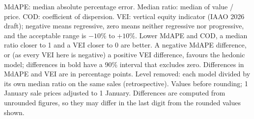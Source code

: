 \begin{table}[htbp]
\begin{tabular}{@{}lrlrrrrccc@{}}
\bottomrule
\end{tabular}
\par\smallskip\footnotesize\raggedright MdAPE: median absolute percentage error. Median ratio: median of value / price.
COD: coefficient of dispersion. VEI: vertical equity indicator (IAAO 2026 draft); negative means regressive,
zero means neither regressive nor progressive, and the acceptable range is $-10\%$ to $+10\%$. Lower MdAPE and COD, a
median ratio closer to 1 and a VEI closer to 0 are better. A negative MdAPE difference, or (as every VEI here is
negative) a positive VEI difference, favours the hedonic model; differences in bold have a 90\% interval that excludes
zero. Differences in MdAPE and VEI are in percentage points. Level removed: each model divided by its own median ratio on the same sales
(retrospective). Values before rounding; 1 January sale prices adjusted to 1 January. Differences are computed from unrounded figures, so they may differ in the last digit from the rounded values shown.
\end{table}
